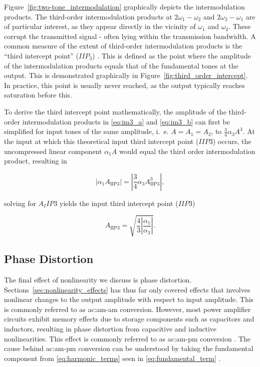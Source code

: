 Figure~\ref{fig:two-tone_intermodulation} graphically depicts the intermodulation products. The third-order intermodulation products at $2\omega_1 - \omega_2$ and $2\omega_2 - \omega_1$ are of particular interest, as they appear directly in the vicinity of $\omega_1$ and $\omega_2$.  These corrupt the transmitted signal - often lying within the transmission bandwidth. A common measure of the extent of third-order intermodulation products is the ``third intercept point'' ($IIP_3$) \cite{razavi}. This is defined as the point where the amplitude of the intermodulation products equals that of the fundamental tones at the output. This is demonstrated graphically in Figure~\ref{fig:third_order_intercept}. In practice, this point is usually never reached, as the output typically reaches saturation before this. 

To derive the third intercept point mathematically, the amplitude of the third-order intermodulation products in \eqref{eq:im3_a} and \eqref{eq:im3_b} can first be simplified for input tones of the same amplitude, i.~e. $A = A_1 = A_2$, to $\frac{3}{4}\alpha_3 A^3$. At the input at which this theoretical input third intercept point ($IIP3$) occurs, the uncompressed linear component $\alpha_1 A$ would equal the third order intermodulation product, resulting in

\begin{equation}
  \left|\alpha_1 A_{\text{IIP3}}\right|
  = \left|\frac{3}{4}\alpha_3 A_{\text{IIP3}}^3\right|,
  \label{eq:iip3_condition}
\end{equation}

solving for $A_IIP3$ yields the input third intercept point ($IIP3$)

\begin{equation}
  A_{\text{IIP3}} = \sqrt{\frac{4}{3}\left|\frac{\alpha_1}{\alpha_3}\right|}.
  \label{eq:iip3}
\end{equation}

\subsection{Phase Distortion}\label{sec:phase_distortion}

The final effect of nonlinearity we discuss is phase distortion. Sections~\ref{sec:nonlinearity_effects} has thus far only covered effects that involves nonlinear changes to the output amplitude with respect to input amplitude. This is commonly referred to as \gls{ac:am-am} conversion. However, most power amplifier circuits exhibit memory effects due to storage components such as capacitors and inductors, resulting in phase distortion from capacitive and inductive nonlinearities. This effect is commonly referred to as \gls{ac:am-pm} conversion \cite{miehle}. The cause behind \gls{ac:am-pm} conversion can be understood by taking the fundamental component from \eqref{eq:harmonic_terms} seen in \eqref{eq:fundamental_term} \cite{maas}.

